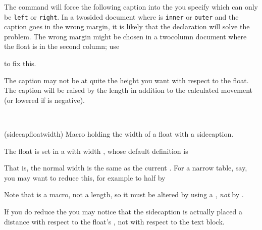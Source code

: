 The command \cmd{\overridescapmargin} will force the following caption into
the  you specify which can only be \texttt{left} or
\texttt{right}. In a twosided document where \cmd{\sidecapmargin}
is \texttt{inner} or \texttt{outer} and the caption goes in the wrong margin,
it is likely that the declaration  will solve
the problem. The wrong margin might be chosen in a twocolumn document
where the float is in the second column; use 
\begin{lcode}
\end{lcode}
to fix this.

    The caption may not be at quite the height you want with respect to the
float. The caption will be raised by the length \lnc{\sidecapraise} 
in addition to the calculated movement (or lowered if \lnc{\sidecapraise}
is negative). 

\begin{syntax}
\cmd{\sidecapfloatwidth} \\
\end{syntax}
\glossary(sidecapfloatwidth)%
  {}%
  {Macro holding the width of a float with a sidecaption.}%

    The float is set in a  with width ,
whose default definition is
\begin{lcode}
\newcommand*{\sidecapfloatwidth}{\linewidth}
\end{lcode}
That is, the normal width is the same as the current \lnc{\linewidth}.
For a narrow table, say, you may want to reduce this, for example to
half by
\begin{lcode}
\renewcommand*{\sidecapfloatwidth}{0.5\linewidth}
\end{lcode}
    Note that \cmd{\sidecapfloatwidth} is a macro, not a length, 
so it must be altered by using a \cmd{\renewcommand*}, 
\emph{not} by \cmd{\setlength}.

    If you do reduce the \cmd{\sidecapfloatwidth} you may notice that the
sidecaption is actually placed a distance \lnc{\sidecapsep} with respect
to the float's , not with respect to the text block.

